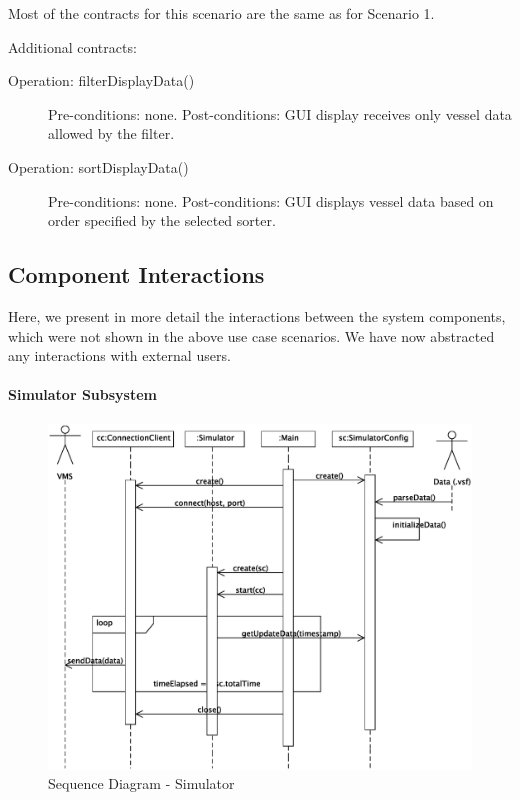 \documentclass{article}
\begin{document}
Most of the contracts for this scenario are the same as for Scenario 1.

Additional contracts:

\begin{description}
  \item[Operation: filterDisplayData()] Pre-conditions: none.\newline
  Post-conditions: GUI display receives only vessel data allowed by the filter.
  \item[Operation: sortDisplayData()] Pre-conditions: none.\newline
  Post-conditions: GUI displays vessel data based on order specified by the selected sorter.
\end{description}

\subsection{Component Interactions}

Here, we present in more detail the interactions between the system components, which were not shown in the above use case scenarios. We have now abstracted any interactions with external users.

\paragraph{Simulator Subsystem}

\begin{figure}[!htb]
\caption{Sequence Diagram - Simulator}
\centering
\includegraphics[scale=0.6]{diagrams/simulator-sequence-diagram.eps}
\end{figure}
\end{document}
